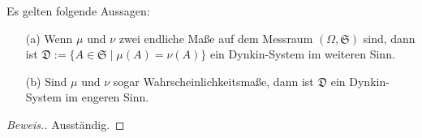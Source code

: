 \begin{lemma}
    Es gelten folgende Aussagen:
    \begin{itemize}
        \item[(a)] Wenn $\mu$ und $\nu$ zwei endliche Maße auf dem Messraum $(\Omega,\mathfrak{S})$ sind, dann ist $\mathfrak{D}:=\{A\in\mathfrak{S}\mid\mu(A)=\nu(A)\}$ ein Dynkin-System im weiteren Sinn.
        \item[(b)] Sind $\mu$ und $\nu$ sogar Wahrscheinlichkeitsmaße, dann ist $\mathfrak{D}$ ein Dynkin-System im engeren Sinn. 
    \end{itemize}
\end{lemma} 
\begin{proof}[Beweis.]
    Ausständig.
\end{proof}